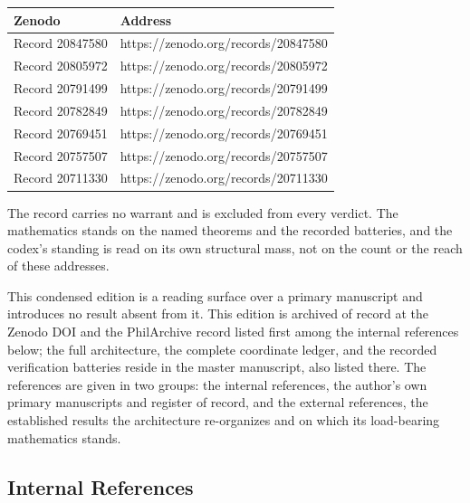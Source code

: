 \documentclass[10pt,twocolumn]{article}
\begin{document}
\begin{center}\small
\begin{tabular}{>{\raggedright\arraybackslash}p{}>{\raggedright\arraybackslash}p{}}
\toprule
\textbf{Zenodo} & \textbf{Address} \\
\midrule
Record 20847580 & https://zenodo.org/records/20847580 \\
Record 20805972 & https://zenodo.org/records/20805972 \\
Record 20791499 & https://zenodo.org/records/20791499 \\
Record 20782849 & https://zenodo.org/records/20782849 \\
Record 20769451 & https://zenodo.org/records/20769451 \\
Record 20757507 & https://zenodo.org/records/20757507 \\
Record 20711330 & https://zenodo.org/records/20711330 \\
\bottomrule
\end{tabular}
\end{center}

The record carries no warrant and is excluded from every verdict. The
mathematics stands on the named theorems and the recorded batteries, and
the codex's standing is read on its own structural mass, not on the
count or the reach of these addresses.

This condensed edition is a reading surface over a primary manuscript
and introduces no result absent from it. This edition is archived of
record at the Zenodo DOI and the PhilArchive record listed first among
the internal references below; the full architecture, the complete
coordinate ledger, and the recorded verification batteries reside in the
master manuscript, also listed there. The references are given in two
groups: the internal references, the author's own primary manuscripts
and register of record, and the external references, the established
results the architecture re-organizes and on which its load-bearing
mathematics stands.

\hypertarget{internal-references}{%
\subsection{Internal References}\label{internal-references}}
\end{document}
